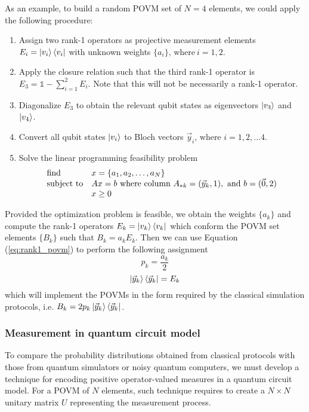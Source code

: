 As an example, to build a random POVM set of $N=4$ elements, we could apply the following procedure:
\begin{enumerate}
\item Assign two rank-1 operators as projective measurement elements $E_i = \ket{v_i}\bra{v_i}$ with unknown weights $\{a_i\} \text{, where}\ i=1,2$.
\item Apply the closure relation such that the third rank-1 operator is $E_3 = \mathbb{1} - \sum_{i=1}^{2}E_i$. Note that this will not be necessarily a rank-1 operator.
\item Diagonalize $E_3$ to obtain the relevant qubit states as eigenvectors $\ket{v_3}$ and $\ket{v_4}$.
\item Convert all qubit states $\ket{v_i}$ to Bloch vectors $\vec{y}_i \text{, where } i=1,2,...4$.
\item Solve the linear programming feasibility problem
\begin{equation*}
\begin{array}{ll@{}ll}
\text{find}  & x = \{a_1, a_2,\dots,a_N\} &\\
\text{subject to}& Ax = b\ \text{where column} \ A_{*k} = (\vec{y}_k, 1),\ \text{and}\ b = (\vec{0}, 2) \\
                 & x \geq 0 
\end{array}
\end{equation*}
\end{enumerate}

Provided the optimization problem is feasible, we obtain the weights $\{a_k\}$ and compute the rank-1 operators $E_k = \ket{v_k}\bra{v_k}$ which conform the POVM set elements $\{B_k\}$ such that $B_k=a_k E_k$. Then we can use Equation (\ref{eq:rank1_povm}) to perform the following assignment
\begin{equation}
    p_k = \frac{a_k}{2}
\end{equation}
\begin{equation}
    \ket{\vec{y}_k}\bra{\vec{y}_k} = E_k
\end{equation}
which will implement the POVMs in the form required by the classical simulation protocols, i.e. $B_{k} = 2p_{k}\ket{\vec{y}_{k}}\bra{\vec{y}_{k}}$.

\subsubsection{Measurement in quantum circuit model}\label{section:neumark}
To compare the probability distributions obtained from classical protocols with those from quantum simulators or noisy quantum computers, we must develop a technique for encoding positive operator-valued measures in a quantum circuit model. For a POVM of $N$ elements, such technique requires to create a $N\times N$ unitary matrix $U$ representing the measurement process.

